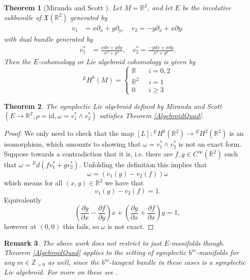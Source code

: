 \documentclass{amsart}
\newcommand{\p}{\partial}
\newcommand{\Z}{\mathbb{Z}}
\newcommand{\R}{\mathbb{R}}
\newcommand{\ra}{\rightarrow}
\newcommand{\id}{\text{id}}
\newtheorem{theorem}{Theorem}
\newtheorem{remark}[theorem]{Remark}
\theoremstyle{definition}
\begin{document}
\begin{theorem}[Miranda and Scott \cite{Miranda_2020}]
    Let $M=\R^2$, and let $E$ be the involutive subbundle of $\mathfrak{X}(\R^2)$ generated by
    \begin{align*}
        v_1 &= x \p_x + y \p_y, \quad
        v_2 = -y \p_x + x \p y.
    \end{align*}
    with dual bundle generated by
    \begin{align*}
        v_1^* &= \frac{xdx + ydy}{x^2+y^2}, \quad
        v_2^* = \frac{-ydx+xdy}{x^2+y^2}.
    \end{align*}
    Then the $E$-cohomology or Lie algebroid cohomology is given by
    \begin{equation*}
        {}^EH^k(M) = \begin{cases}
            \R \quad &i=0,2 \\
            \R^2 &i=1 \\
            0 &i\geq 3
        \end{cases}
    \end{equation*}
\end{theorem}

\begin{theorem}
    The symplectic Lie algebroid defined by Miranda and Scott $(E \ra \R^2, \rho = \id, \omega = v_1^* \wedge v_2^*)$ satisfies Theorem \ref{AlgebroidQuad}.
\end{theorem}
\begin{proof}
    We only need to check that the map $[L]:{}^EH^0(\R^2) \ra {}^EH^2(\R^2)$ is an isomorphism, which amounts to showing that $\omega = v_1^* \wedge v_2^*$ is not an exact form. Suppose towards a contradiction that it is, i.e. there are $f,g \in C^\infty(\R^2)$ such that $\omega = {}^Ed(fv_1^* + g v_2^*)$. Unfolding the definition this implies that
    \begin{equation*}
        \omega = (v_1(g) - v_2(f))\omega
    \end{equation*}
    which means for all $(x,y) \in \R^2$ we have that 
    \begin{equation*}
        v_1(g)-v_2(f)=1.
    \end{equation*}
    Equivalently
    \begin{equation*}
        \left(\frac{\p g}{\p x} - \frac{\p f }{\p y}\right)x+ \left( \frac{\p g}{\p x} + \frac{\p f}{\p x} \right)y=1,
    \end{equation*}
    however at $(0,0)$ this fails, so $\omega$ is not exact.
\end{proof}
\begin{remark}
    The above work does not restrict to just $E$-manifolds though. Theorem \ref{AlgebroidQuad} applies to the setting of symplectic $b^m$-manifolds for any $m \in \Z_{>0}$ as well, since the $b^m$-tangent bundle in these cases is a symplectic Lie algebroid. For more on these see \cite{Guillemin_2014}. 
\end{remark}
\end{document}
